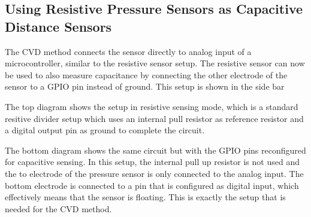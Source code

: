 \documentclass{sigchi-ext}
\begin{document}
\subsection{Using Resistive Pressure Sensors as Capacitive Distance Sensors}
The CVD method connects the sensor directly to analog input of a
microcontroller, similar to the resistive sensor setup. The resistive sensor can
now be used to also measure capacitance by connecting the other electrode of the
sensor to a GPIO pin instead of ground. This setup is shown in the side bar

The top diagram shows the setup in resistive sensing mode, which is a standard
resitive divider setup which uses an internal pull resistor as reference
resistor and a digital output pin as ground to complete the circuit.

The bottom diagram shows the same circuit but with the GPIO pins reconfigured
for capacitive sensing. In this setup, the internal pull up resistor is not used
and the to electrode of the pressure sensor is only connected to the analog
input. The bottom electrode is connected to a pin that is configured as digital
input, which effectively means that the sensor is floating. This is exactly the
setup that is needed for the CVD method.
\end{document}
